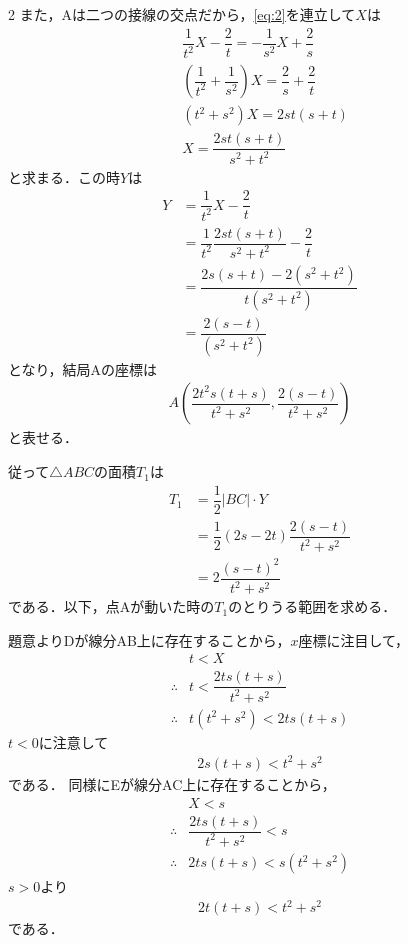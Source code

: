 \documentclass[../../main.tex]{subfiles}
\begin{document}
\begin{multicols}{2}
  また，Aは二つの接線の交点だから，\cref{eq:2}を連立して$X$は
  \begin{align}
    & \dfrac{1}{t^2}X - \dfrac{2}{t} = -\dfrac{1}{s^2}X + \dfrac{2}{s}            \\
    & \left(\dfrac{1}{t^2}+\dfrac{1}{s^2}\right)X =  \dfrac{2}{s} +  \dfrac{2}{t} \\
    & \left(t^2+s^2\right)X =  2st(s+t)                                       \\
    & X = \dfrac{2st(s+t)}{s^2+t^2}
  \end{align}
  と求まる．この時$Y$は
  \begin{align}
    Y
    & = \dfrac{1}{t^2}X - \dfrac{2}{t}                       \\
    & =\dfrac{1}{t^2} \dfrac{2st(s+t)}{s^2+t^2} -\dfrac{2}{t} \\
    & =\dfrac{2s(s+t)-2(s^2+t^2)}{t(s^2+t^2)}               \\
    & =\dfrac{2(s-t) }{(s^2+t^2)}
  \end{align}
  となり，結局Aの座標は
  \begin{align}
    A(\dfrac{2t^2s(t+s)}{t^2+s^2}, \dfrac{2(s-t)}{t^2+s^2}) \label{eq:4}
  \end{align}
  と表せる．

  従って$\triangle ABC$の面積$T_1$は
  \begin{align}
    T_1
    & = \dfrac{1}{2} |BC|\cdot Y                      \\
    & = \dfrac{1}{2}(2s-2t)\dfrac{2(s-t)}{t^2+s^2}     \\
    & = 2\dfrac{(s-t)^2}{t^2+s^2} \label{eq:5}
  \end{align}
  である．以下，点Aが動いた時の$T_1$のとりうる範囲を求める．

  題意よりDが線分AB上に存在することから，$x$座標に注目して，
  \begin{align}
    & t < X                        \\
    \therefore
    & t < \dfrac{2ts(t+s)}{t^2+s^2} \\
    \therefore
    & t(t^2+s^2) < 2ts(t+s)
  \end{align}
  $t<0$に注意して
  \begin{align}
    2s(t+s) < t^2+s^2 \label{eq:6}
  \end{align}
  である．
  同様にEが線分AC上に存在することから，
  \begin{align}
    & X < s                        \\
    \therefore
    & \dfrac{2ts(t+s)}{t^2+s^2} < s \\
    \therefore
    & 2ts(t+s) < s(t^2+s^2)
  \end{align}
  $s>0$より
  \begin{align}
    2t(t+s) < t^2+s^2 \label{eq:7}
  \end{align}
  である．


\end{multicols}
\end{document}
